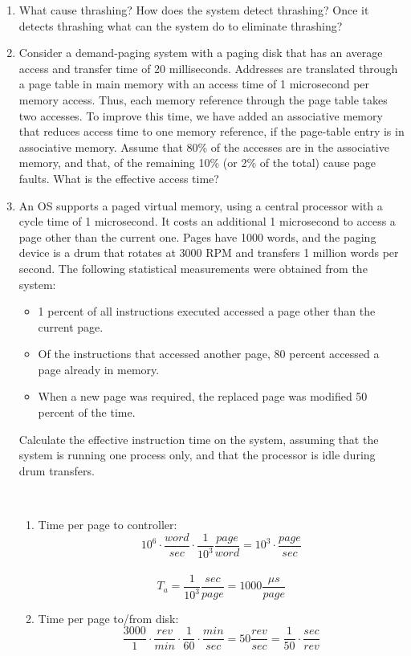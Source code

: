 \documentclass{article}
\newcommand{\answercolor}{Bittersweet}
\newcommand{\answer}[1]{{\\\color{\answercolor}\footnotesize\itshape{#1}}}
\begin{document}
\begin{enumerate}
\begin{enumerate}
		\end{enumerate}

		\item What cause thrashing? How does the system detect thrashing? Once it detects thrashing what can the system do to eliminate thrashing?
		\item Consider a demand-paging system with a paging disk that has an average access and transfer time of 20 milliseconds. Addresses are translated through a page table in main memory with an access time of 1 microsecond per memory access. Thus, each memory reference through the page table takes two accesses. To improve this time, we have added an associative memory that reduces access time to one memory reference, if the page-table entry is in associative memory. Assume that 80\% of the accesses are in the associative memory, and that, of the remaining 10\% (or 2\% of the total) cause page faults. What is the effective access time?
		\item An OS supports a paged virtual memory, using a central processor with a cycle time of 1 microsecond. It costs an additional 1 microsecond to access a page other than the current one. Pages have 1000 words, and the paging device is a drum that rotates at 3000 RPM and transfers 1 million words per second. The following statistical measurements were obtained from the system:
		\begin{itemize}
			\item 1 percent of all instructions executed accessed a page other than the current page.
			\item Of the instructions that accessed another page, 80 percent accessed a page already in memory.
			\item When a new page was required, the replaced page was modified 50 percent of the time.
		\end{itemize}
		Calculate the effective instruction time on the system, assuming that the system is running one process only, and that the processor is idle during drum transfers.
        \answer{
            \begin{enumerate}
                \item Time per page to controller: \[10^6\cdot\frac{word}{sec}\cdot\frac{1}{10^3}\frac{page}{word}= 10^3\cdot\frac{page}{sec}\]\\
                \[T_a=\frac{1}{10^3}\frac{sec}{page} = 1000\frac{\mu s}{page}\]
                \item Time per page to/from disk: \[\frac{3000}{1}\cdot\frac{rev}{min}\cdot\frac{1}{60}\cdot\frac{min}{sec}=50\frac{rev}{sec} = \frac{1}{50}\cdot\frac{sec}{rev}\]\\

\end{enumerate}}
\end{enumerate}
\end{document}

